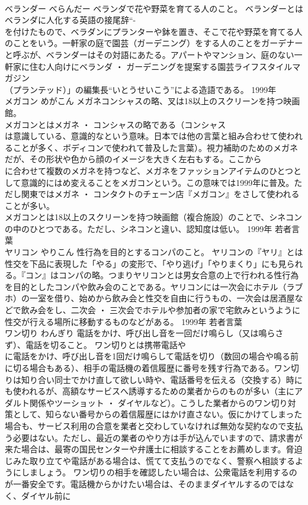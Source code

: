 \documentclass[8pt]{extreport}
\begin{document}
\begin{CJK}{UTF8}{min}
\\	ベランダー	べらんだー	ベランダで花や野菜を育てる人のこと。	ベランダーとはベランダに人化する英語の接尾辞“-
\\	を付けたもので、ベラダンにプランターや鉢を置き、そこで花や野菜を育てる人のことをいう。一軒家の庭で園芸（ガーデニング）をする人のことをガーデナーと呼ぶが、ベランダーはその対語にあたる。アパートやマンション、庭のない一軒家に住む人向けにベランダ ・ ガーデニングを提案する園芸ライフスタイルマガジン
\\	（プランテッド）」の編集長“いとうせいこう”による造語である。	1999年	
\\	メガコン	めがこん	メガネコンシャスの略、叉は18以上のスクリーンを持つ映画館。	
\\	メガコンとはメガネ ・ コンシャスの略である（コンシャス
\\	は意識している、意識的なという意味。日本では他の言葉と組み合わせて使われることが多く、ボディコンで使われて普及した言葉）。視力補助のためのメガネだが、その形状や色から顔のイメージを大きく左右もする。ここから
\\	に合わせて複数のメガネを持つなど、メガネをファッションアイテムのひとつとして意識的にはめ変えることをメガコンという。この意味では1999年に普及。ただし関東ではメガネ ・ コンタクトのチェーン店『メガコン』をさして使われることが多い。 
\\	メガコンとは18以上のスクリーンを持つ映画館（複合施設）のことで、シネコンの中のひとつである。ただし、シネコンと違い、認知度は低い。	1999年	若者言葉	
\\	ヤリコン	やりこん	性行為を目的とするコンパのこと。	ヤリコンの『ヤリ』とは性交を下品に表現した「やる」の変形で、「やり逃げ」「やりまくり」にも見られる。『コン』はコンパの略。つまりヤリコンとは男女合意の上で行われる性行為を目的としたコンパや飲み会のことである。ヤリコンには一次会にホテル（ラブホ）の一室を借り、始めから飲み会と性交を自由に行うもの、一次会は居酒屋などで飲み会をし、二次会 ・ 三次会でホテルや参加者の家で宅飲みというように性交が行える場所に移動するものなどがある。	1999年	若者言葉	
\\	ワン切り	わんぎり	電話をかけ、呼び出し音を一回だけ鳴らし（又は鳴らさず）、電話を切ること。	ワン切りとは携帯電話や
\\	に電話をかけ、呼び出し音を1回だけ鳴らして電話を切り（数回の場合や鳴る前に切る場合もある）、相手の電話機の着信履歴に番号を残す行為である。ワン切りは知り合い同士でかけ直して欲しい時や、電話番号を伝える（交換する）時にも使われるが、高額なサービスへ誘導するための業者からのものが多い（主にアダルト関係やツーショット ・ ダイヤルなど）。こうした業者からのワン切り対策として、知らない番号からの着信履歴にはかけ直さない。仮にかけてしまった場合も、サービス利用の合意を業者と交わしていなければ無効な契約なので支払う必要はない。ただし、最近の業者のやり方は手が込んでいますので、請求書が来た場合は、最寄の国民センターや弁護士に相談することをお薦めします。脅迫じみた取り立てや電話がある場合は、慌てて支払うのでなく、警察へ相談するようにしましょう。 ワン切りの相手を確認したい場合は、公衆電話を利用するのが一番安全です。電話機からかけたい場合は、そのままダイヤルするのではなく、ダイヤル前に

\end{CJK}
\end{document}
